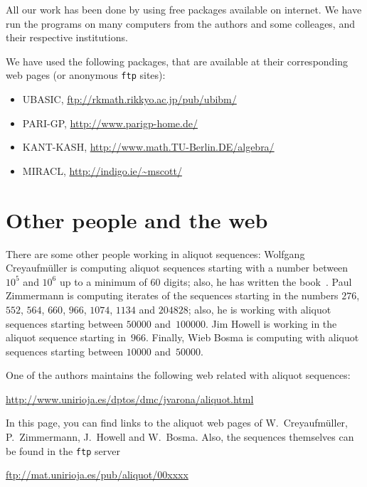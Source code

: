 \documentclass[11pt,twoside]{article}   %
\theoremstyle{plain}
\theoremstyle{definition}
\theoremstyle{remark}
\begin{document}
All our work has been done by using free packages available on internet.
We have run the programs on many computers from the authors and some colleages, and their
respective institutions.

We have used the following packages, that are available at their corresponding web pages
(or anonymous \texttt{ftp} sites):

\begin{itemize}
\setlength{\itemsep}{0pt}

\item UBASIC,
\url{ftp://rkmath.rikkyo.ac.jp/pub/ubibm/}

\item PARI-GP,
\url{http://www.parigp-home.de/}

\item KANT-KASH,
\url{http://www.math.TU-Berlin.DE/algebra/}

\item MIRACL,
\url{http://indigo.ie/~mscott/}

\end{itemize}


\section*{Other people and the web}

There are some other people working in aliquot sequences:
Wolfgang Creyaufm\"uller is computing aliquot sequences starting with a number between
$10^5$ and $10^6$ up to a minimum of $60$ digits; also, he has written the
book~\cite{Crey}.
Paul Zimmermann is computing iterates of the sequences starting in the numbers $276$,
$552$, $564$, $660$, $966$, $1074$, $1134$ and $204828$; also, he is
working with aliquot sequences starting between $50000$ and~$100000$.
Jim Howell is working in the aliquot sequence starting in~$966$.
Finally, Wieb Bosma is computing with aliquot sequences starting between $10000$ and~$50000$.

One of the authors maintains the following web related with aliquot sequences:
\begin{center}
\quad\url{http://www.unirioja.es/dptos/dmc/jvarona/aliquot.html}\quad
\end{center}
In this page, you can find links to the aliquot web pages of
W.~Creyaufm\"uller, P.~Zimmermann, J.~Howell and W.~Bosma. Also, the
sequences themselves can be found in the \texttt{ftp} server
\begin{center}
\quad\url{ftp://mat.unirioja.es/pub/aliquot/00xxxx}\quad
\end{center}
\end{document}
